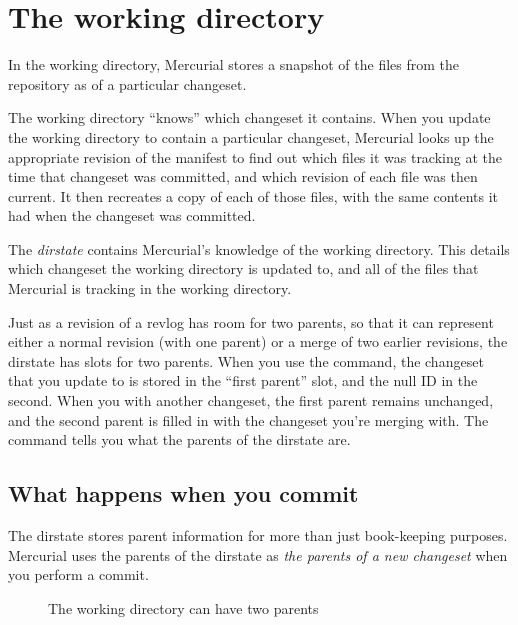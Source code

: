 \begin{figure}[ht]
  \centering
  \caption{}
  \label{fig:concepts:revlog}
\end{figure}

\section{The working directory}

In the working directory, Mercurial stores a snapshot of the files
from the repository as of a particular changeset.

The working directory ``knows'' which changeset it contains.  When you
update the working directory to contain a particular changeset,
Mercurial looks up the appropriate revision of the manifest to find
out which files it was tracking at the time that changeset was
committed, and which revision of each file was then current.  It then
recreates a copy of each of those files, with the same contents it had
when the changeset was committed.

The \emph{dirstate} contains Mercurial's knowledge of the working
directory.  This details which changeset the working directory is
updated to, and all of the files that Mercurial is tracking in the
working directory.

Just as a revision of a revlog has room for two parents, so that it
can represent either a normal revision (with one parent) or a merge of
two earlier revisions, the dirstate has slots for two parents.  When
you use the  command, the changeset that you update to
is stored in the ``first parent'' slot, and the null ID in the second.
When you  with another changeset, the first parent
remains unchanged, and the second parent is filled in with the
changeset you're merging with.  The  command tells you
what the parents of the dirstate are.

\subsection{What happens when you commit}

The dirstate stores parent information for more than just book-keeping
purposes.  Mercurial uses the parents of the dirstate as \emph{the parents of a new changeset} when you perform a commit.

\begin{figure}[ht]
  \centering
  \caption{The working directory can have two parents}
  \label{fig:concepts:wdir}
\end{figure}

